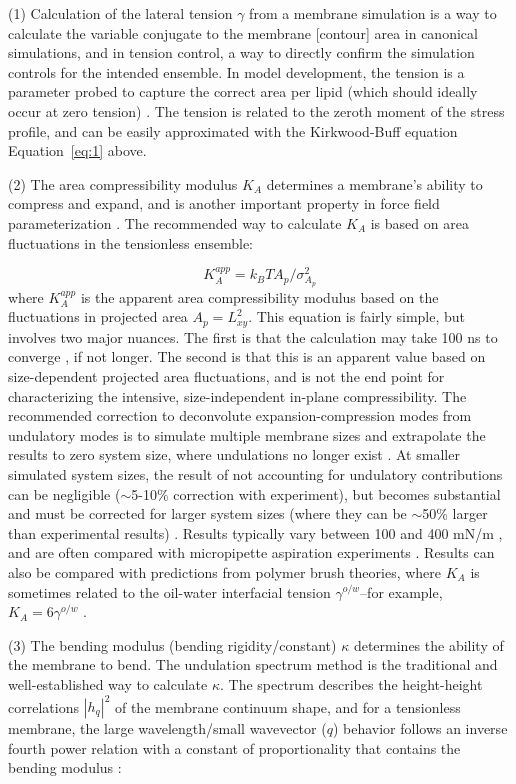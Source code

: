\documentclass[9pt,bestpractices]{livecoms}
\begin{document}
(1) Calculation of the lateral tension $\gamma$ from a membrane simulation is a way to calculate the variable conjugate to the membrane [contour] area in canonical simulations, and in tension control, a way to directly confirm the simulation controls for the intended ensemble.
In model development, the tension is a parameter probed to capture the correct area per lipid (which should ideally occur at zero tension) \cite{Zgorski2016}.
The tension is related to the zeroth moment of the stress profile, and can be easily approximated with the Kirkwood-Buff equation Equation~\ref{eq:1} above.

(2) The area compressibility modulus $K_A$ determines a membrane's ability to compress and expand, and is another important property in force field parameterization \cite{Venable2015}.
The recommended way to calculate $K_A$ is based on area fluctuations in the tensionless ensemble:

\begin{equation}\label{eq:7}
	K_A^{app} = k_BTA_p/\sigma_{A_p}^2
\end{equation}
where $K_A^{app}$ is the apparent area compressibility modulus based on the fluctuations in projected area $A_p=L_{xy}^2$.
This equation is fairly simple, but involves two major nuances.
The first is that the calculation may take 100 ns to converge \cite{Venable2015}, if not longer.
The second is that this is an apparent value based on size-dependent projected area fluctuations, and is not the end point for characterizing the intensive, size-independent in-plane compressibility.
The recommended correction to deconvolute expansion-compression modes from undulatory modes is to simulate multiple membrane sizes and extrapolate the results to zero system size, where undulations no longer exist \cite{Waheed2009}.
At smaller simulated system sizes, the result of not accounting for undulatory contributions can be negligible ($\sim$5-10\% correction with experiment), but becomes substantial and must be corrected for larger system sizes (where they can be $\sim$50\% larger than experimental results) \cite{Waheed2009,Venable2015}.
Results typically vary between 100 and 400 mN/m \cite{Venable2015}, and are often compared with micropipette aspiration experiments \cite{Rawicz2000}.
Results can also be compared with predictions from polymer brush theories, where $K_A$ is sometimes related to the oil-water interfacial tension $\gamma^{o/w}$--for example, $K_A = 6 \gamma^{o/w}$ \cite{Rawicz2000}.

(3) The bending modulus (bending rigidity/constant) $\kappa$ determines the ability of the membrane to bend.
The undulation spectrum method \cite{Goetz1999,Lindahl2000} is the traditional and well-established way to calculate $\kappa$.
The spectrum describes the height-height correlations $\left|h_q\right|^2$ of the membrane continuum shape, and for a tensionless membrane, the large wavelength/small wavevector ($q$) behavior follows an inverse fourth power relation with a constant of proportionality that contains the bending modulus \cite{Goetz1999,Lindahl2000}:
\end{document}
